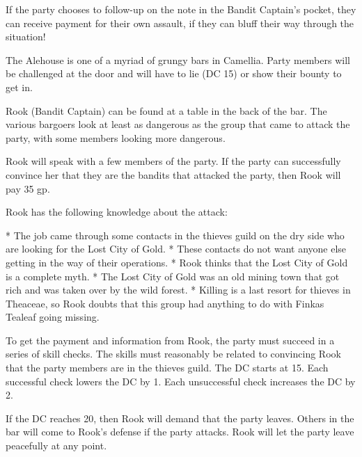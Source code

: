 If the party chooses to follow-up on the note in the Bandit Captain's pocket, they can receive payment for their own assault, if they can bluff their way through the situation!

The Alehouse is one of a myriad of grungy bars in Camellia.
Party members will be challenged at the door and will have to lie (DC 15) or show their bounty to get in.

Rook (Bandit Captain) can be found at a table in the back of the bar.
The various bargoers look at least as dangerous as the group that came to attack the party, with some members looking more dangerous.

Rook will speak with a few members of the party.
If the party can successfully convince her that they are the bandits that attacked the party, then Rook will pay 35 gp.

Rook has the following knowledge about the attack:

* The job came through some contacts in the thieves guild on the dry side who are looking for the Lost City of Gold.
* These contacts do not want anyone else getting in the way of their operations.
* Rook thinks that the Lost City of Gold is a complete myth.
* The Lost City of Gold was an old mining town that got rich and was taken over by the wild forest.
* Killing is a last resort for thieves in Theaceae, so Rook doubts that this group had anything to do with Finkas Tealeaf going missing.

To get the payment and information from Rook, the party must succeed in a series of skill checks.
The skills must reasonably be related to convincing Rook that the party members are in the thieves guild.
The DC starts at 15.
Each successful check lowers the DC by 1.
Each unsuccessful check increases the DC by 2.

If the DC reaches 20, then Rook will demand that the party leaves.
Others in the bar will come to Rook's defense if the party attacks.
Rook will let the party leave peacefully at any point.
